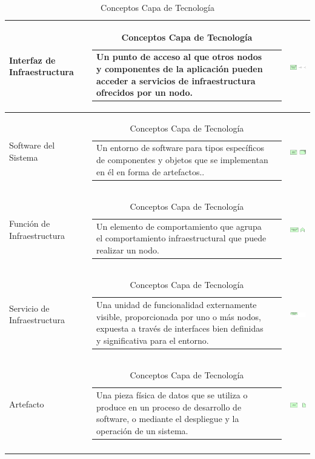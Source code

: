 \begin{longtable}[c]{|p{2.55cm}|l|c|}
	Interfaz de Infraestructura	& \begin{tabular}[c]{p{7cm}@{}l@{}}Un punto de acceso al que otros nodos y componentes de la aplicación pueden acceder a servicios de infraestructura ofrecidos por un nodo.\end{tabular} & \includegraphics[width=35mm]{arquitectura/adm_lenguaje/imgs/technology/InfrastructureInterface}          \\ \hline
	Software del Sistema   		& \begin{tabular}[c]{p{7cm}@{}l@{}}Un entorno de software para tipos específicos de componentes y objetos que se implementan en él en forma de artefactos..\end{tabular} & \includegraphics[width=35mm]{arquitectura/adm_lenguaje/imgs/technology/SystemSoftware}          \\ \hline
	Función de Infraestructura	& \begin{tabular}[c]{p{7cm}@{}l@{}}Un elemento de comportamiento que agrupa el comportamiento infraestructural que puede realizar un nodo.\end{tabular} & \includegraphics[width=35mm]{arquitectura/adm_lenguaje/imgs/technology/InfrastructureFunction}          \\ \hline		
	Servicio de Infraestructura	& \begin{tabular}[c]{p{7cm}@{}l@{}}Una unidad de funcionalidad externamente visible, proporcionada por uno o más nodos, expuesta a través de interfaces bien definidas y significativa para el entorno.\end{tabular} & \includegraphics[width=35mm]{arquitectura/adm_lenguaje/imgs/technology/InfrastructureService}          \\ \hline
	Artefacto				   	& \begin{tabular}[c]{p{7cm}@{}l@{}}Una pieza física de datos que se utiliza o produce en un proceso de desarrollo de software, o mediante el despliegue y la operación de un sistema.\end{tabular} & \includegraphics[width=35mm]{arquitectura/adm_lenguaje/imgs/technology/Artifact}          \\ \hline
	\caption{Conceptos Capa de Tecnología \cite{WEB7}}
\end{longtable}

